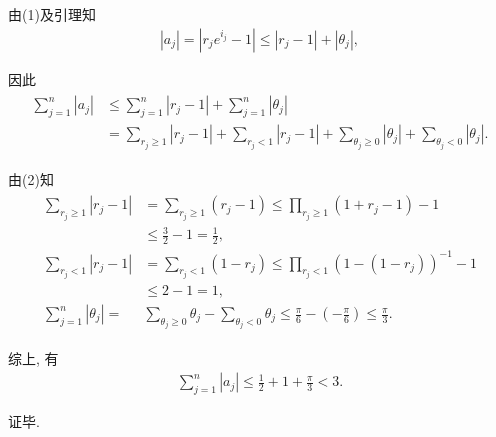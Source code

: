 \begin{solution}
	由(1)及引理知
	\begin{align*}
		\left|a_j\right|=\left|r_j e^{i_j}-1\right| \leqslant\left|r_j-1\right|+\left|\theta_j\right|,
	\end{align*}

	因此
	\begin{align*}
		\begin{aligned}
			\sum_{j=1}^n\left|a_j\right| & \leqslant \sum_{j=1}^n\left|r_j-1\right|+\sum_{j=1}^n\left|\theta_j\right|                                                                                         \\
			                             & =\sum_{r_j \geqslant 1}\left|r_j-1\right|+\sum_{r_j<1}\left|r_j-1\right|+\sum_{\theta_j \geqslant 0}\left|\theta_j\right|+\sum_{\theta_j<0}\left|\theta_j\right| .
		\end{aligned}
	\end{align*}

	由(2)知
	\begin{align*}
		\begin{aligned}
			\sum_{r_j \geqslant 1}\left|r_j-1\right| & =\sum_{r_j \geqslant 1}\left(r_j-1\right) \leqslant \prod_{r_j \geqslant 1}\left(1+r_j-1\right)-1                                             \\
			                                         & \leqslant \frac{3}{2}-1=\frac{1}{2},                                                                                                          \\
			\sum_{r_j<1}\left|r_j-1\right|           & =\sum_{r_j<1}\left(1-r_j\right) \leqslant \prod_{r_j<1}\left(1-\left(1-r_j\right)\right)^{-1}-1                                               \\
			                                         & \leqslant 2-1=1,                                                                                                                              \\
			\sum_{j=1}^n\left|\theta_j\right|=       & \sum_{\theta_j \geqslant 0} \theta_j-\sum_{\theta_j<0} \theta_j \leqslant \frac{\pi}{6}-\left(-\frac{\pi}{6}\right) \leqslant \frac{\pi}{3} .
		\end{aligned}
	\end{align*}

	综上, 有
	\begin{align*}
		\sum_{j=1}^n\left|a_j\right| \leqslant \frac{1}{2}+1+\frac{\pi}{3}<3 .
	\end{align*}

	证毕.
\end{solution}

